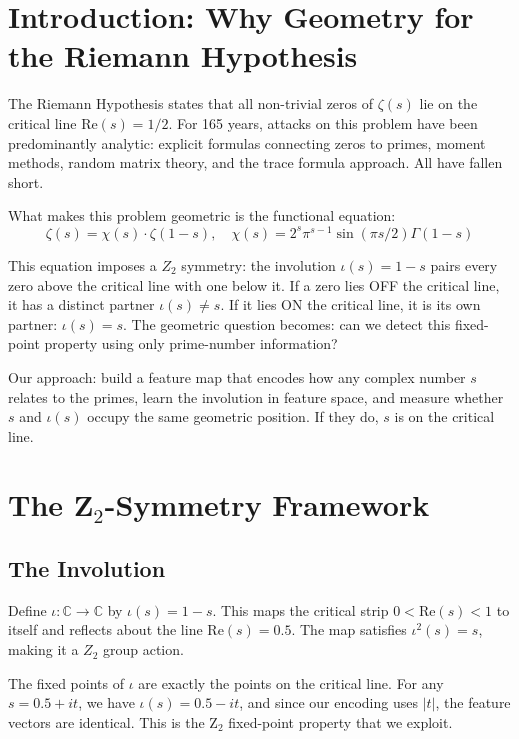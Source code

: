 \documentclass[11pt,a4paper]{article}
\begin{document}
\section{Introduction: Why Geometry for the Riemann Hypothesis}

The Riemann Hypothesis states that all non-trivial zeros of $\zeta(s)$ lie on the critical line $\mathrm{Re}(s)=1/2$. For 165 years, attacks on this problem have been predominantly analytic: explicit formulas connecting zeros to primes, moment methods, random matrix theory, and the trace formula approach. All have fallen short.

What makes this problem geometric is the functional equation:
$$\zeta(s) = \chi(s) \cdot \zeta(1-s), \quad \chi(s) = 2^s \pi^{s-1} \sin(\pi s/2) \Gamma(1-s)$$

This equation imposes a $Z_2$ symmetry: the involution $\iota(s) = 1-s$ pairs every zero above the critical line with one below it. If a zero lies OFF the critical line, it has a distinct partner $\iota(s) \neq s$. If it lies ON the critical line, it is its own partner: $\iota(s) = s$. The geometric question becomes: can we detect this fixed-point property using only prime-number information?

Our approach: build a feature map that encodes how any complex number $s$ relates to the primes, learn the involution in feature space, and measure whether $s$ and $\iota(s)$ occupy the same geometric position. If they do, $s$ is on the critical line.

\section{The Z$_2$-Symmetry Framework}

\subsection{The Involution}

Define $\iota: \mathbb{C} \to \mathbb{C}$ by $\iota(s) = 1 - s$. This maps the critical strip $0 < \mathrm{Re}(s) < 1$ to itself and reflects about the line $\mathrm{Re}(s) = 0.5$. The map satisfies $\iota^2(s) = s$, making it a $Z_2$ group action.

The fixed points of $\iota$ are exactly the points on the critical line. For any $s = 0.5 + it$, we have $\iota(s) = 0.5 - it$, and since our encoding uses $|t|$, the feature vectors are identical. This is the Z$_2$ fixed-point property that we exploit.
\end{document}
